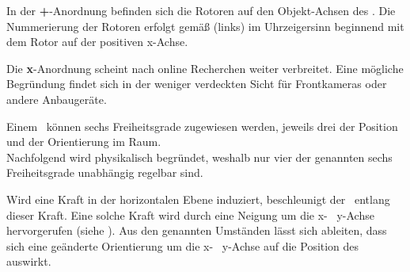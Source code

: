 In der \textbf{+}-Anordnung befinden sich die Rotoren auf den Objekt-Achsen des \Quad[s]. Die Nummerierung der Rotoren erfolgt gemäß  (links) im Uhrzeigersinn beginnend mit dem Rotor auf der positiven x-Achse.


Die \textbf{x}-Anordnung scheint nach online Recherchen weiter verbreitet. Eine mögliche Begründung findet sich in der weniger verdeckten Sicht für Frontkameras oder andere Anbaugeräte.



Einem \Quad\ können sechs Freiheitsgrade zugewiesen werden, jeweils drei der Position und der Orientierung im Raum.\\
Nachfolgend wird physikalisch begründet, weshalb nur vier der genannten sechs Freiheitsgrade unabhängig regelbar sind. 

Wird eine Kraft in der horizontalen Ebene induziert, beschleunigt der \Quad\ entlang dieser Kraft. Eine solche Kraft wird durch eine Neigung um die x- \bzw\ y-Achse hervorgerufen (siehe ). Aus den genannten Umständen lässt sich ableiten, dass sich eine geänderte Orientierung um die x- \bzw\ y-Achse auf die Position des \Quad[s] auswirkt.

